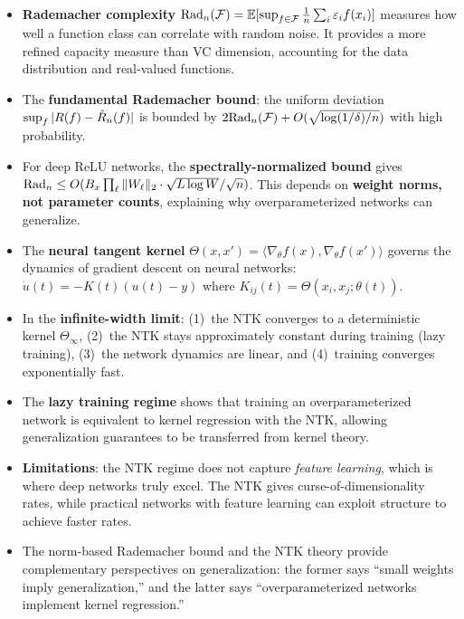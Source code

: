 \documentclass[11pt,a4paper]{article}
\begin{document}
\begin{itemize}
  \item \textbf{Rademacher complexity}
    $\mathrm{Rad}_n(\mathcal{F}) = \mathbb{E}[\sup_{f \in \mathcal{F}} \frac{1}{n}
    \sum_i \varepsilon_i f(x_i)]$ measures how well a function
    class can correlate with random noise.  It provides a more
    refined capacity measure than VC dimension, accounting for the
    data distribution and real-valued functions.

  \item The \textbf{fundamental Rademacher bound}: the uniform
    deviation $\sup_f |R(f) - \hat{R}_n(f)|$ is bounded by
    $2\mathrm{Rad}_n(\mathcal{F}) + O(\sqrt{\log(1/\delta)/n})$ with high
    probability.

  \item For deep ReLU networks, the \textbf{spectrally-normalized
    bound} gives
    $\mathrm{Rad}_n \le O(B_x \prod_\ell \|W_\ell\|_2 \cdot
    \sqrt{L \log W} / \sqrt{n})$.  This depends on
    \textbf{weight norms, not parameter counts}, explaining why
    overparameterized networks can generalize.

  \item The \textbf{neural tangent kernel} $\Theta(x, x') =
    \langle \nabla_\theta f(x), \nabla_\theta f(x') \rangle$
    governs the dynamics of gradient descent on neural networks:
    $\dot{u}(t) = -K(t)(u(t) - y)$ where $K_{ij}(t) =
    \Theta(x_i, x_j; \theta(t))$.

  \item In the \textbf{infinite-width limit}: (1)~the NTK converges
    to a deterministic kernel $\Theta_\infty$, (2)~the NTK stays
    approximately constant during training (lazy training),
    (3)~the network dynamics are linear, and (4)~training converges
    exponentially fast.

  \item The \textbf{lazy training regime} shows that training an
    overparameterized network is equivalent to kernel regression
    with the NTK, allowing generalization guarantees to be
    transferred from kernel theory.

  \item \textbf{Limitations}: the NTK regime does not capture
    \emph{feature learning}, which is where deep networks truly
    excel.  The NTK gives curse-of-dimensionality rates, while
    practical networks with feature learning can exploit structure
    to achieve faster rates.

  \item The norm-based Rademacher bound and the NTK theory provide
    complementary perspectives on generalization: the former says
    ``small weights imply generalization,'' and the latter says
    ``overparameterized networks implement kernel regression.''
\end{itemize}
\end{document}

